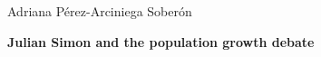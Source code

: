 \documentclass[11pt,spanish,letterpaper]{article}
\theoremstyle{plain}
\begin{document}
\begin{flushleft}
Adriana P\'erez-Arciniega Sober\'on
\end{flushleft}
\begin{center}
\textbf{Julian Simon and the population growth debate}
\end{center}



\end{document}
